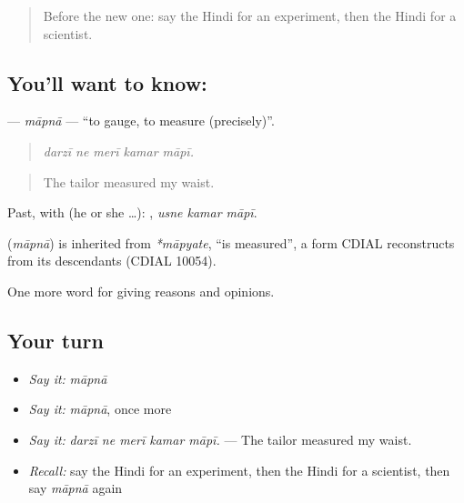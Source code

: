 \label{lesson:HI-C361-mapna}



\begin{quote}
Before the new one: say the Hindi for an experiment, then the Hindi for a scientist.
\end{quote}

\subsection*{You'll want to know: }
\textbf{} — \emph{māpnā} — \textquotedblleft{}to gauge, to measure (precisely)\textquotedblright{}.

\begin{quote}
    
\end{quote}

\begin{quote}
\emph{darzī ne merī kamar māpī.}
\end{quote}

\begin{quote}
The tailor measured my waist.
\end{quote}

Past, with  (he or she …):   , \emph{usne kamar māpī}.

\begin{cousinweb}
\textbf{} (\emph{māpnā}) is inherited from \emph{*māpyate}, \textquotedblleft{}is measured\textquotedblright{}, a form CDIAL reconstructs from its descendants (CDIAL 10054).
\end{cousinweb}

\begin{grammarlens}[title={What you've built}]
One more word for giving reasons and opinions.
\end{grammarlens}

\subsection*{Your turn}
\begin{itemize}
\raggedright
  \item \emph{Say it:} \emph{māpnā}
  \item \emph{Say it:} \emph{māpnā}, once more
  \item \emph{Say it:} \emph{darzī ne merī kamar māpī.} — The tailor measured my waist.
  \item \emph{Recall:} say the Hindi for an experiment, then the Hindi for a scientist, then say \emph{māpnā} again
\end{itemize}

